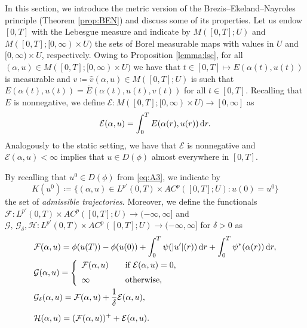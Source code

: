 \documentclass[reqno]{amsart}
\newcommand{\disp}{\displaystyle}
\newcommand{\dr}{{\rm d} r}
\newcommand{\ove}{\overline}
\newcommand{\haz}{\widehat}
\newcommand{\GG}{{\mathcal G}}
\newcommand{\EE}{{\mathcal E}}
\newcommand{\FF}{{\mathcal F}}
\newcommand{\HH}{{\mathcal H}}
\begin{document}
 In this section, we introduce the metric version of the
Brezis--Ekeland--Nayroles principle (Theorem \ref{prop:BEN}) and discuss some of its
properties. Let us   endow $[0,T]$ with the Lebesgue measure and indicate
  by $M([0,T]; U)$ and $M([0,T];[0,\infty)\times U)$  the sets of Borel
  measurable maps with values in $U$ and $[0,\infty) \times U$, respectively. Owing to
  Proposition \ref{lemma:lsc}, for all $(\alpha,u) \in
  M([0,T];[0,\infty)\times U)$ we have that $t \in [0,T]\mapsto  
  E(\alpha(t),u(t))$ is measurable and $ v\coloneqq\haz v(\alpha,u) \in
  M([0,T];U)$ is such that $
  E(\alpha(t),u(t))= \ove E(\alpha(t),u(t), v (t))$ for all $t \in
  [0,T]$. Recalling that $ E $  is nonnegative,  we  define $ \EE: M([0,T];[0,\infty) \times
 U) \to [0,\infty]$ as
  $$ \EE(\alpha,u) = 
  \disp\int_0^T E(\alpha(r),u(r))\, \dr.$$
Analogously to the static setting,  we have that $\EE $  is
nonnegative and  
$\EE(\alpha,u) < \infty$ implies that $u  \in D(\phi)$ almost
everywhere in 
$[0,T]$. 


By recalling that $u^0 \in D(\phi)$ from
\eqref{eq:A3}, we indicate by 
\begin{equation}
  \label{eq:K}
  K(u^0)\coloneqq\{(\alpha,u)\in L^{p'}(0,T)\times AC^p([0,T];U) : u(0)=u^0\}
\end{equation}
the set of {\it admissible trajectories}. Moreover, we define the functionals $\FF: L^{p'}(0,T)\times
AC^p([0,T];U) \to (-\infty,\infty]$ and $\GG,\, 
\GG_\delta,  \HH : L^{p'}(0,T)\times
AC^p([0,T];U)\to (-\infty,\infty]$ for $\delta>0$ as
\begin{align*}
   &\FF(\alpha,u) = 
     \phi(u(T))-\phi(u(0)) + \int_0^T\psi(
       |u'|(r))\, \dr +  \int_0^T \psi^*(\alpha (r))\, \dr , \\
   & \GG(\alpha,u) =
     \left\{
     \begin{array}{ll}
       \FF(\alpha,u) \quad&\text{if} \ \EE (\alpha,u)=0,\\[2mm]
       \infty&\text{otherwise},
     \end{array}
               \right. \\
  &\GG_\delta(\alpha,u) = \FF(\alpha,u) + \frac1\delta \EE(\alpha,u),\\[2mm]
  & \HH(\alpha,u) = (\FF(\alpha,u))^+ + \EE(\alpha,u).
\end{align*}
\end{document}
